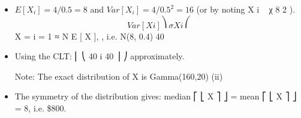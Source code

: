 \documentclass[a4paper,12pt]{article}
\begin{document}
\begin{itemize}


\item $E[X_i ] = 4/0.5 = 8$ and $Var[X_i ] = 4/0.5^2 = 16$ (or by noting X i ~ χ 8 2 ).
\[Var [ X i ] ⎞
\sigma X i ⎛\]
X = i = 1 ≈ N E [ X ],
, i.e. N(8, 0.4)
40
\item Using the CLT:
⎜
⎝
40
i
40
⎟
⎠
approximately.
\item [Note: The exact distribution of X is Gamma(160,20)]
(ii)
\item The symmetry of the distribution gives: median ⎡ ⎣ X ⎤ ⎦ = mean ⎡ ⎣ X ⎤ ⎦ = 8,
i.e. \$800.
\end{itemize}
\end{document}

